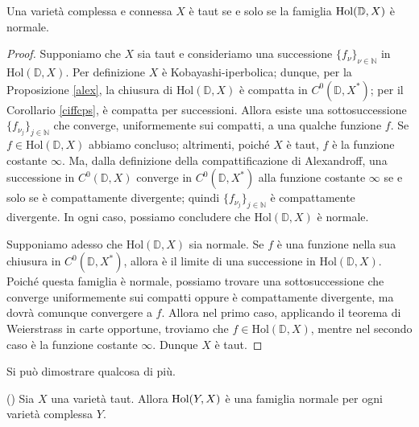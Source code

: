\begin{prop} \label{tautsse}
    Una varietà complessa e connessa $X$ è taut se e solo se la famiglia $\textnormal{Hol}(\mathbb{D},X)$ è normale.
\end{prop}
\begin{proof}
    Supponiamo che $X$ sia taut e consideriamo una successione $\{f_{\nu}\}_{\nu\in\mathbb{N}}$ in $\text{Hol}(\mathbb{D},X)$. Per definizione $X$ è Kobayashi-iperbolica; dunque, per la Proposizione \ref{alex}, la chiusura di $\text{Hol}(\mathbb{D},X)$ è compatta in $C^0(\mathbb{D},X^*)$; per il Corollario \ref{ciffcps}, è compatta per successioni. Allora esiste una sottosuccessione $\{f_{\nu_j}\}_{j \in \mathbb{N}}$ che converge, uniformemente sui compatti, a una qualche funzione $f$. Se $f \in \text{Hol}(\mathbb{D},X)$ abbiamo concluso; altrimenti, poiché $X$ è taut, $f$ è la funzione costante $\infty$. Ma, dalla definizione della compattificazione di Alexandroff, una successione in $C^0(\mathbb{D},X)$ converge in $C^0(\mathbb{D},X^*)$ alla funzione costante $\infty$ se e solo se è compattamente divergente; quindi $\{f_{\nu_j}\}_{j \in \mathbb{N}}$ è compattamente divergente. In ogni caso, possiamo concludere che $\text{Hol}(\mathbb{D},X)$ è normale.

    Supponiamo adesso che $\text{Hol}(\mathbb{D},X)$ sia normale. Se $f$ è una funzione nella sua chiusura in $C^0(\mathbb{D},X^*)$, allora è il limite di una successione in $\text{Hol}(\mathbb{D},X)$. Poiché questa famiglia è normale, possiamo trovare una sottosuccessione che converge uniformemente sui compatti oppure è compattamente divergente, ma dovrà comunque convergere a $f$. Allora nel primo caso, applicando il teorema di Weierstrass in carte opportune, troviamo che $f \in \text{Hol}(\mathbb{D},X)$, mentre nel secondo caso è la funzione costante $\infty$. Dunque $X$ è taut.
\end{proof}

Si può dimostrare qualcosa di più.

\begin{prop}
    (\cite[Theorem 2]{B1}) Sia $X$ una varietà taut. Allora $\textnormal{Hol}(Y,X)$ è una famiglia normale per ogni varietà complessa $Y$.
\end{prop}

